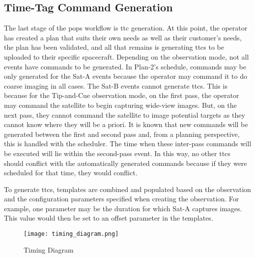 \subsection{Time-Tag Command Generation}\label{sec:ttc-gen}

The last stage of the \gls{pops} workflow is \gls{ttc} generation.  At this
point, the operator has created a plan that suits their own needs as well as
their customer’s needs, the plan has been validated, and all that remains is
generating \glspl{ttc} to be uploaded to their specific spacecraft.  Depending
on the observation mode, not all events have commands to be generated. In
Plan-2's schedule, commands may be only generated for the Sat-A events because
the operator may command it to do coarse imaging in all cases. The Sat-B events cannot
generate \glspl{ttc}. This is because for the Tip-and-Cue observation mode, on
the first pass, the operator may command the satellite to begin capturing
wide-view images.  But, on the next pass, they cannot command the satellite to
image potential targets as they cannot know where they will be a priori. It is
known that new commands will be generated between the first and second pass
and, from a planning perspective, this is handled with the scheduler. The time
when these inter-pass commands will be executed will lie within the second-pass
event. In this way, no other \glspl{ttc} should conflict with the automatically
generated commands because if they were scheduled for that time, they would
conflict. 

To generate \glspl{ttc}, templates are combined and populated based on the
observation and the configuration parameters specified when creating the
observation. For example, one parameter may be the duration for which Sat-A
captures images. This value would then be set to an offset parameter in the
templates. 

\begin{figure}[h] 
    \centering
    \texttt{[image: timing\_diagram.png]} 
    \caption{Timing Diagram}
    \label{fig:timing-diagram} 
\end{figure}

